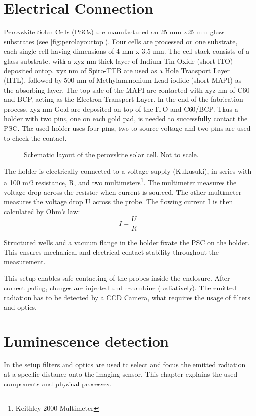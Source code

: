 \section{Electrical Connection}\label{sec:electricalconnection}
Perovskite Solar Cells (PSCs) are manufactured on 25 mm x25 mm glass substrates (see \autoref{fig:perolayouttop}). Four cells are processed on one substrate, each single cell having dimensions of 4 mm x 3.5 mm. The cell stack consists of a glass substrate, with a xyz nm thick layer of Indium Tin Oxide (short ITO) deposited ontop. xyz nm of Spiro-TTB are used as a Hole Transport Layer (HTL), followed by 500 nm of Methylammonium-Lead-iodide (short MAPI) as the absorbing layer. The top side of the MAPI are contacted with xyz nm of C60 and BCP, acting as the Electron Transport Layer. In the end of the fabrication process, xyz nm Gold are deposited on top of the ITO and C60/BCP. Thus a holder with two pins, one on each gold pad, is needed to successfully contact the PSC. The used holder uses four pins, two to source voltage and two pins are used to check the contact.
\begin{figure}
	\centering
	
	\caption{Schematic layout of the perovskite solar cell. Not to scale.}
	\label{fig:perolayouttop}
\end{figure}

The holder is electrically connected to a voltage supply (Kukusuki), in series with a 100 m$\Omega$ resistance, R, and two multimeters\footnote{Keithley 2000 Multimeter}. The multimeter measures the voltage drop across the resistor when current is sourced. The other multimeter measures the voltage drop U across the probe. The flowing current I is then calculated by Ohm's law:
\begin{equation}
	I = \frac{U}{R}
\end{equation}

Structured wells and a vacuum flange in the holder fixate the PSC on the holder. This ensures mechanical and electrical contact stability throughout the measurement.

This setup enables safe contacting of the probes inside the enclosure. After correct poling, charges are injected and recombine (radiatively). The emitted radiation has to be detected by a CCD Camera, what requires the usage of filters and optics.

\section{Luminescence detection}\label{sec:luminescencedetection}
In the setup filters and optics are used to select and focus the emitted radiation at a specific distance onto the imaging sensor. This chapter explains the used components and physical processes.
